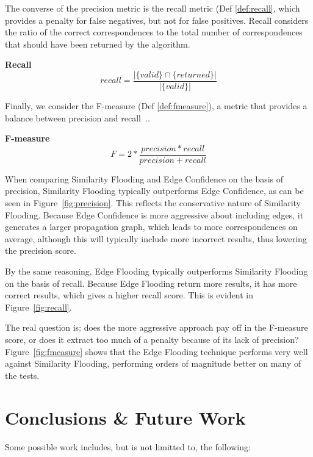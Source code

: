 \documentclass[letterpaper,twocolumn,12pt]{article}
\begin{document}
The converse of the precision metric is the recall metric (Def \ref{def:recall}, which provides a penalty for false negatives, but not for false positives. 
Recall considers the ratio of the correct correspondences to the total number of correspondences that should have been returned by the algorithm.

\begin{defn}
\textbf{Recall}
\label{def:recall}
$$
	recall = \frac{|\{valid \} \cap  \{returned \}|}{|\{valid \}|}
$$
\end{defn}

Finally, we consider the F-measure (Def \ref{def:fmeasure}), a metric that provides a balance between precision and recall~\cite{rijsbergen:1979:ir}.. 

\begin{defn}
				\textbf{F-measure}
\label{def:fmeasure}
$$
	F = 2*\frac{precision * recall}{precision + recall}	
$$
\end{defn}

When comparing Similarity Flooding and Edge Confidence on the basis of precision, Similarity Flooding typically outperforms Edge Confidence, as can be seen in Figure~\ref{fig:precision}. 
This reflects the conservative nature of Similarity Flooding.
Because Edge Confidence is more aggressive about including edges, it generates a larger propagation graph, which leads to more correspondences on average, although this will typically include more incorrect results, thus lowering the precision score.

By the same reasoning, Edge Flooding typically outperforms Similarity Flooding on the basis of recall. 
Because Edge Flooding return more results, it has more correct results, which gives a higher recall score. 
This is evident in Figure~\ref{fig:recall}.

The real question is: does the more aggressive approach pay off in the F-measure score, or does it extract too much of a penalty because of its lack of precision?
Figure~\ref{fig:fmeasure} shows that the Edge Flooding technique performs very well against Similarity Flooding, performing orders of magnitude better on many of  the tests.

\section{Conclusions \& Future Work}
\label{sec:conclusions}

Some possible work includes, but is not limitted to, the following:
\end{document}

